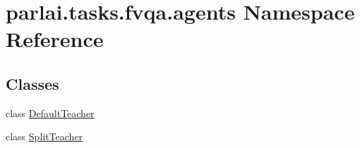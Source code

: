 \hypertarget{namespaceparlai_1_1tasks_1_1fvqa_1_1agents}{}\section{parlai.\+tasks.\+fvqa.\+agents Namespace Reference}
\label{namespaceparlai_1_1tasks_1_1fvqa_1_1agents}
\subsection*{Classes}
\begin{DoxyCompactItemize}
\item 
class \hyperlink{classparlai_1_1tasks_1_1fvqa_1_1agents_1_1DefaultTeacher}{Default\+Teacher}
\item 
class \hyperlink{classparlai_1_1tasks_1_1fvqa_1_1agents_1_1SplitTeacher}{Split\+Teacher}
\end{DoxyCompactItemize}
